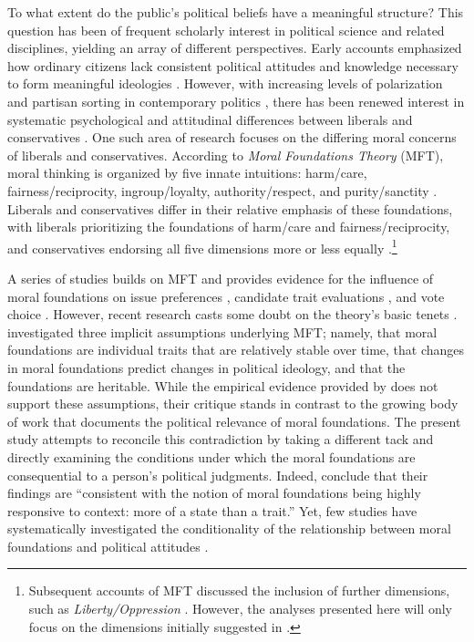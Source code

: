 \documentclass[12pt]{article}
\begin{document}
To what extent do the public's political beliefs have a meaningful structure? This question has been of frequent scholarly interest in political science and related disciplines, yielding an array of different perspectives. Early accounts emphasized how ordinary citizens lack consistent political attitudes and knowledge necessary to form meaningful ideologies \citep{converse1964nature}. However, with increasing levels of polarization and partisan sorting in contemporary politics \citep[e.g.][]{mason2014disrespectfully}, there has been renewed interest in systematic psychological and attitudinal differences between liberals and conservatives \citep{jost2006end}. One such area of research focuses on the differing moral concerns of liberals and conservatives. According to \textit{Moral Foundations Theory} (MFT), moral thinking is organized by five innate intuitions: harm/care, fairness/reciprocity, ingroup/loyalty, authority/respect, and purity/sanctity \citep{haidt2008moral,graham2011mapping}. Liberals and conservatives differ in their relative emphasis of these foundations, with liberals prioritizing the foundations of harm/care and fairness/reciprocity, and conservatives endorsing all five dimensions more or less equally \citep{graham2009liberals}.\footnote{Subsequent accounts of MFT discussed the inclusion of further dimensions, such as \textit{Liberty/Oppression} \citep[c.f.,][]{graham2013moral,haidt2012righteous}. However, the analyses presented here will only focus on the dimensions initially suggested in \citet{haidt2008moral}.}

A series of studies builds on MFT and provides evidence for the influence of moral foundations on issue preferences \citep{koleva2012tracing, kertzer2014moral, low2015moral, clifford2015concerns}, candidate trait evaluations \citep{clifford2014linking}, and vote choice \citep{iyer2010beyond, franks2015using}. However, recent research casts some doubt on the theory's basic tenets \citep[e.g.,][]{suhler2011can}. \citet{smith2016intuitive} investigated three implicit assumptions underlying MFT; namely, that moral foundations are individual traits that are relatively stable over time, that changes in moral foundations predict changes in political ideology, and that the foundations are heritable. While the empirical evidence provided by \citet{smith2016intuitive} does not support these assumptions, their critique stands in contrast to the growing body of work that documents the political relevance of moral foundations. The present study attempts to reconcile this contradiction by taking a different tack and directly examining the conditions under which the moral foundations are consequential to a person's political judgments. Indeed, \citet{smith2016intuitive} conclude that their findings are ``consistent with the notion of moral foundations being highly responsive to context: more of a state than a trait.'' Yet, few studies have systematically investigated the conditionality of the relationship between moral foundations and political attitudes \citep[see][for a notable exception]{clifford2015concerns}.
\end{document}
